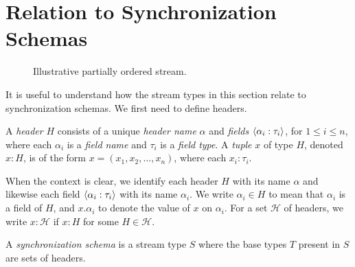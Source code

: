 
\section{Relation to Synchronization Schemas}
\label{45:ssec:illustrative-example}

\begin{figure}
    \centering
    \caption{Illustrative partially ordered stream.}
    \label{45:fig:gps-sps}
\end{figure}

It is useful to understand how the stream types in this section relate to synchronization schemas.
We first need to define headers.
\begin{definition}
A \emph{header} $H$
consists of a unique \emph{header name} \(\alpha\)
and \emph{fields} \(\left\langle\alpha_i: \tau_i\right\rangle\), for $1\le i\le n$,
where each \(\alpha_i\) is a \emph{field name}
and \(\tau_i\) is a \emph{field type}.
A \emph{tuple} $x$ of type \(H\), denoted $x : H$, is of the form
\(x = (x_1, x_2, \ldots, x_n)\), where each \(x_i : \tau_i\).
\end{definition}

When the context is clear, we identify each header \(H\) with its name \(\alpha\)
and likewise each field \(\left\langle\alpha_i: \tau_i\right\rangle\) with its name \(\alpha_i\).
We write \(\alpha_i \in H\) to mean that \(\alpha_i\) is a field of \(H\), and
\(x.\alpha_i\) to denote the value of \(x\) on \(\alpha_i\).
For a set $\mathcal{H}$ of headers, we write
$x: \mathcal{H}$ if $x : H$ for some $H \in \mathcal{H}$.

\begin{definition}
A \emph{synchronization schema} is a stream type $S$
where the base types $T$ present in $S$ are sets of headers.
\end{definition}

